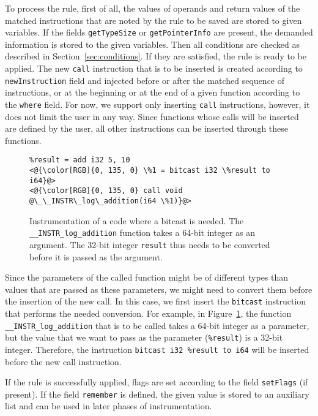 To process the rule, first of all, the values of operands and return values of
the matched instructions that are noted by the rule to be saved are stored to
given variables. If the fields \texttt{getTypeSize} or \texttt{getPointerInfo}
are present, the demanded information is stored to the given variables. Then
all conditions are checked as described in Section~\ref{sec:conditions}. If
they are satisfied, the rule is ready to be applied. The new \texttt{call}
instruction that is to be inserted is created according to
\texttt{newInstruction} field and injected before or after the matched sequence
of instructions, or at the beginning or at the end of a given function
according to the \texttt{where} field. For now, we support only inserting
\texttt{call} instructions, however, it does not limit the user in any way.
Since functions whose calls will be inserted are defined by the user, all other
instructions can be inserted through these functions.

\begin{figure}[t]
\begin{lstlisting}
%result = add i32 5, 10
<@{\color[RGB]{0, 135, 0} \%1 = bitcast i32 \%result to i64}@>
<@{\color[RGB]{0, 135, 0} call void @\_\_INSTR\_log\_addition(i64 \%1)}@>
\end{lstlisting}
\caption{Instrumentation of a code where a bitcast is needed. The
\texttt{\_\_INSTR\_log\_addition} function takes a 64-bit integer as an
argument. The 32-bit integer \texttt{result} thus needs to be converted before
it is passed as the argument.}
\label{fig:bitcast_example}
\end{figure}
Since the parameters of the called function might be of different types than
values that are passed as these parameters, we might need to convert them
before the insertion of the new call. In this case, we first insert the
\texttt{bitcast} instruction that performs the needed conversion. For example,
in Figure~\ref{fig:bitcast_example}, the function
\texttt{\_\_INSTR\_log\_addition} that is to be called takes a 64-bit integer
as a parameter, but the value that we want to pass as the parameter
(\texttt{\%result}) is a 32-bit integer. Therefore, the instruction \texttt{bitcast
i32 \%result to i64} will be inserted before the new call instruction.

If the rule is successfully applied, flags are set according to the field
\texttt{setFlags} (if present). If the field \texttt{remember} is defined, the
given value is stored to an auxiliary list and can be used in later phases of
instrumentation.

